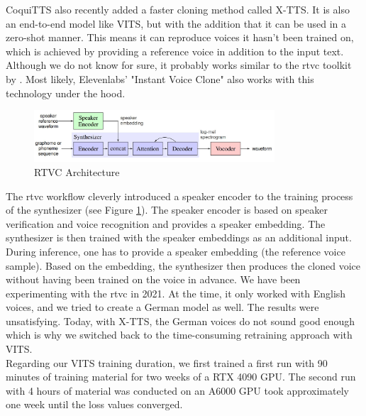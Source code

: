 \documentclass[
  a4paper,  %
  twoside,  %
  bibliography=totoc,
  headsepline,
  cleardoublepage=empty,
  parskip=half,
  draft=false
]{scrbook}
\begin{document}
CoquiTTS also recently added a faster cloning method called X-TTS. It is also an end-to-end model like VITS, but with the addition that it can be used in a zero-shot manner. This means it can reproduce voices it hasn't been trained on, which is achieved by providing a reference voice in addition to the input text. Although we do not know for sure, it probably works similar to the \gls{rtvc} toolkit by \citeauthor{jemineRealTimeVoiceCloning2019}. Most likely, Elevenlabs' "Instant Voice Clone" also works with this technology under the hood.

\begin{figure}[h]
  \centering
  \includegraphics[width=0.8\textwidth]{./graphics/rtvc.png}
  \caption{RTVC Architecture \cite{jemineRealTimeVoiceCloning2019}}
  \label{fig:rtvc-arch}
\end{figure}

The \gls{rtvc} workflow cleverly introduced a speaker encoder to the training process of the synthesizer (see Figure \ref{fig:rtvc-arch}). The speaker encoder is based on speaker verification and voice recognition and provides a speaker embedding. The synthesizer is then trained with the speaker embeddings as an additional input. During inference, one has to provide a speaker embedding (the reference voice sample). Based on the embedding, the synthesizer then produces the cloned voice without having been trained on the voice in advance. We have been experimenting with the \gls{rtvc} in 2021. At the time, it only worked with English voices, and we tried to create a German model as well. The results were unsatisfying. Today, with X-TTS, the German voices do not sound good enough which is why we switched back to the time-consuming retraining approach with VITS. \\
Regarding our VITS training duration, we first trained a first run with 90 minutes of training material for two weeks of a RTX 4090 GPU. The second run with 4 hours of material was conducted on an A6000 GPU took approximately one week until the loss values converged. 
\end{document}
